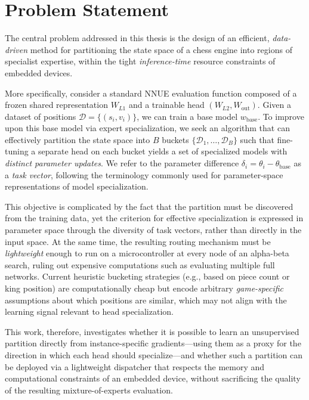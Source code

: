 \section{Problem Statement}\label{sec:problem-statement}

The central problem addressed in this thesis is the design of an efficient, \emph{data-driven} method for partitioning the state space of a chess engine into regions of specialist expertise, within the tight \emph{inference-time} resource constraints of embedded devices.

More specifically, consider a standard NNUE evaluation function composed of a frozen shared representation \(W_{L1}\) and a trainable head \((W_{L2}, W_{\mathrm{out}})\). Given a dataset of positions \(\mathcal{D} = \{(s_i, v_i)\}\), we can train a base model \(w_{\mathrm{base}}\). To improve upon this base model via expert specialization, we seek an algorithm that can effectively partition the state space into \(B\) buckets \(\{\mathcal{D}_1, \dots, \mathcal{D}_B\}\) such that fine-tuning a separate head on each bucket yields a set of specialized models with \emph{distinct parameter updates}. We refer to the parameter difference \(\delta_i = \theta_i-\theta_{\mathrm{base}}\) as a \emph{task vector}, following the terminology commonly used for parameter-space representations of model specialization.

This objective is complicated by the fact that the partition must be discovered from the training data, yet the criterion for effective specialization is expressed in parameter space through the diversity of task vectors, rather than directly in the input space. At the same time, the resulting routing mechanism must be \emph{lightweight} enough to run on a microcontroller at every node of an alpha-beta search, ruling out expensive computations such as evaluating multiple full networks. Current heuristic bucketing strategies (e.g., based on piece count or king position) are computationally cheap but encode arbitrary \emph{game-specific} assumptions about which positions are similar, which may not align with the learning signal relevant to head specialization.

This work, therefore, investigates whether it is possible to learn an unsupervised partition directly from instance-specific gradients---using them as a proxy for the direction in which each head should specialize---and whether such a partition can be deployed via a lightweight dispatcher that respects the memory and computational constraints of an embedded device, without sacrificing the quality of the resulting mixture-of-experts evaluation.

